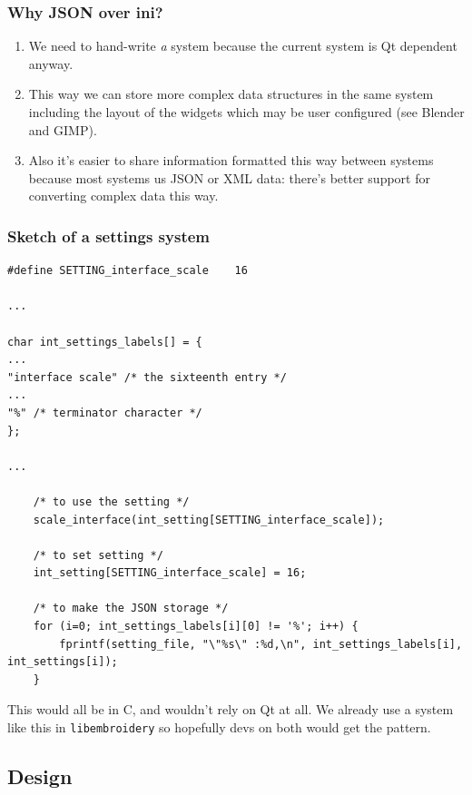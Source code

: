 \documentclass[a4paper, 11pt]{report}
\begin{document}
\hypertarget{why-json-over-ini-1}{%
\subsubsection{Why JSON over ini?}\label{why-json-over-ini-1}}

\begin{enumerate}
\def\labelenumi{\arabic{enumi}.}
\item
  We need to hand-write \emph{a} system because the current system is Qt
  dependent anyway.
\item
  This way we can store more complex data structures in the same system
  including the layout of the widgets which may be user configured (see
  Blender and GIMP).
\item
  Also it's easier to share information formatted this way between
  systems because most systems us JSON or XML data: there's better
  support for converting complex data this way.
\end{enumerate}

\hypertarget{sketch-of-a-settings-system-1}{%
\subsubsection{Sketch of a settings
system}\label{sketch-of-a-settings-system-1}}

\begin{verbatim}
#define SETTING_interface_scale    16

...

char int_settings_labels[] = {
...
"interface scale" /* the sixteenth entry */
...
"%" /* terminator character */
};

...

    /* to use the setting */
    scale_interface(int_setting[SETTING_interface_scale]);

    /* to set setting */
    int_setting[SETTING_interface_scale] = 16;

    /* to make the JSON storage */
    for (i=0; int_settings_labels[i][0] != '%'; i++) {
        fprintf(setting_file, "\"%s\" :%d,\n", int_settings_labels[i], int_settings[i]);
    }
\end{verbatim}

This would all be in C, and wouldn't rely on Qt at all. We already use a
system like this in \texttt{libembroidery} so hopefully devs on both
would get the pattern.

\hypertarget{design-1}{%
\subsection{Design}\label{design-1}}
\end{document}
